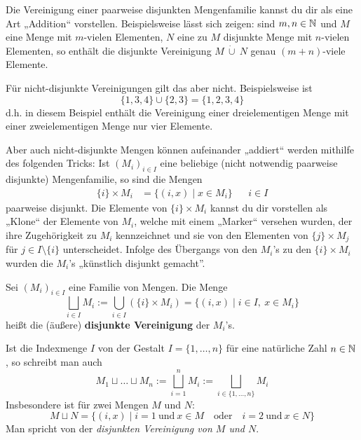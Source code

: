 \begin{bem}
    Die Vereinigung einer paarweise disjunkten Mengenfamilie kannst du dir als eine Art „Addition“ vorstellen. Beispielsweise lässt sich zeigen: sind $m,n\in \mathbb N$ und $M$ eine Menge mit $m$-vielen Elementen, $N$ eine zu $M$ disjunkte Menge mit $n$-vielen Elementen, so enthält die disjunkte Vereinigung $M\ \dot\cup\ N$ genau $(m+n)$-viele Elemente.

    Für nicht-disjunkte Vereinigungen gilt das aber nicht. Beispielsweise ist
        \[\{1,3,4\} \cup \{2,3\}= \{1,2,3,4\} \]
    d.h. in diesem Beispiel enthält die Vereinigung einer dreielementigen Menge mit einer zweielementigen Menge nur vier Elemente.

    Aber auch nicht-disjunkte Mengen können aufeinander „addiert“ werden mithilfe des folgenden Tricks: Ist $(M_i)_{i\in I}$ eine beliebige (nicht notwendig paarweise disjunkte) Mengenfamilie, so sind die Mengen
    \begin{align*}
        \{i\}\times M_i &= \{(i,x) \mid x\in M_i\} && i\in I
    \end{align*}
    paarweise disjunkt. Die Elemente von $\{i\}\times M_i$ kannst du dir vorstellen als „Klone“ der Elemente von $M_i$, welche mit einem „Marker“ versehen wurden, der ihre Zugehörigkeit zu $M_i$ kennzeichnet und sie von den Elementen von $\{j\}\times M_j$ für $j\in I\setminus \{i\}$ unterscheidet. Infolge des Übergangs von den $M_i$'s zu den $\{i\}\times M_i$ wurden die $M_i$'s „künstlich disjunkt gemacht”.
\end{bem}


\begin{defin} \label{def:disjunktcup} 
    Sei $(M_i)_{i\in I}$ eine Familie von Mengen. Die Menge
        \[ \bigsqcup_{i\in I} M_i := \bigcup_{i\in I} (\{i\}\times M_i) = \{(i,x) \mid i\in I,\ x\in M_i \}\]
    heißt die (äußere) \textbf{disjunkte Vereinigung} der $M_i$'s.
    
    Ist die Indexmenge $I$ von der Gestalt $I=\{1,\dots , n\}$ für eine natürliche Zahl $n\in \mathbb N$, so schreibt man auch
        \[ M_1\sqcup\ldots\sqcup M_n := \bigsqcup_{i=1}^n M_i := \bigsqcup_{i\in \{1,\dots , n\}} M_i \]
    Insbesondere ist für zwei Mengen $M$ und $N$:
        \[ M\sqcup N = \{ (i,x)\mid i=1\ \text{und}\ x\in M\quad\text{oder}\quad i=2\ \text{und}\ x\in N\} \]
    Man spricht von der \emph{disjunkten Vereinigung von $M$ und $N$}.
\end{defin}


